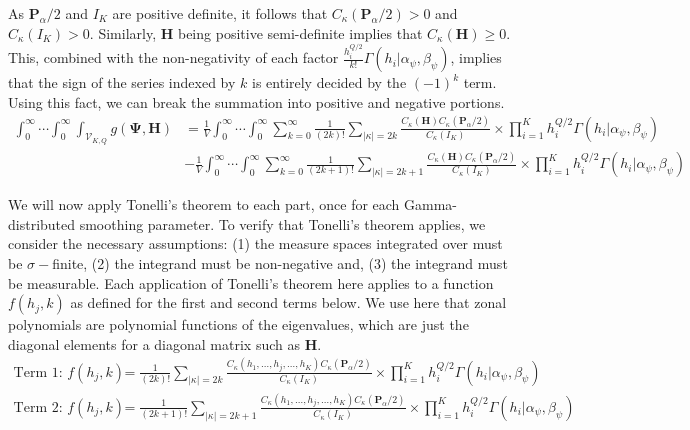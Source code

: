 \documentclass[12pt]{article}
\begin{document}
As $\mathbf{P}_\alpha/2$ and $I_K$ are positive definite, it follows that $C_\kappa(\mathbf{P}_\alpha/2) > 0$ and $C_\kappa(I_K) > 0$. Similarly, $\mathbf{H}$ being positive semi-definite implies that $C_\kappa(\mathbf{H}) \geq 0$. This, combined with the non-negativity of each factor $\frac{h_i^{Q/2}}{k!} \Gamma(h_i|\alpha_\psi, \beta_\psi)$, implies that the sign of the series indexed by $k$ is entirely decided by the $(-1)^k$ term. Using this fact, we can break the summation into positive and negative portions.
\begin{align*}
    \int_0^{\infty} \cdots \int_0^\infty \int_{\mathcal{V}_{K,Q}} g(\boldsymbol{\Psi}, \mathbf{H}) & = \frac{1}{V}\int_0^\infty \cdots \int_0^\infty \sum_{k = 0}^\infty \frac{1}{(2k)!} \sum_{|\kappa| = 2k} \frac{C_\kappa(\mathbf{H})C_\kappa(\mathbf{P}_\alpha/2)}{C_\kappa(I_K)} \times \prod_{i = 1}^K h_i^{Q/2} \Gamma(h_i| \alpha_\psi, \beta_\psi)\\
    & - \frac{1}{V}\int_0^\infty \cdots \int_0^\infty \sum_{k = 0}^\infty \frac{1}{(2k+1)!} \sum_{|\kappa| = 2k+1} \frac{C_\kappa(\mathbf{H})C_\kappa(\mathbf{P}_\alpha/2)}{C_\kappa(I_K)} \times \prod_{i = 1}^K h_i^{Q/2} \Gamma(h_i| \alpha_\psi, \beta_\psi)
\end{align*}

We will now apply Tonelli's theorem to each part, once for each Gamma-distributed smoothing parameter. To verify that Tonelli's theorem applies, we consider the necessary assumptions: (1) the measure spaces integrated over must be $\sigma-$finite, (2) the integrand must be non-negative and, (3) the integrand must be measurable. Each application of Tonelli's theorem here applies to a function $f(h_j, k)$ as defined for the first and second terms below. We use here that zonal polynomials are polynomial functions of the eigenvalues, which are just the diagonal elements for a diagonal matrix such as $\mathbf{H}$.
\begin{align*}
    \text{Term 1: } f(h_j, k) & = \frac{1}{(2k)!} \sum_{|\kappa| = 2k} \frac{C_\kappa(h_1, \ldots, h_j, \ldots, h_K)C_\kappa(\mathbf{P}_\alpha/2)}{C_\kappa(I_K)} \times \prod_{i = 1}^K h_i^{Q/2} \Gamma(h_i| \alpha_\psi, \beta_\psi)\\
    \text{Term 2: } f(h_j, k) & =\frac{1}{(2k+1)!} \sum_{|\kappa| = 2k+1} \frac{C_\kappa(h_1, \ldots, h_j, \ldots, h_K)C_\kappa(\mathbf{P}_\alpha/2)}{C_\kappa(I_K)} \times \prod_{i = 1}^K h_i^{Q/2} \Gamma(h_i| \alpha_\psi, \beta_\psi)
\end{align*}
\end{document}
